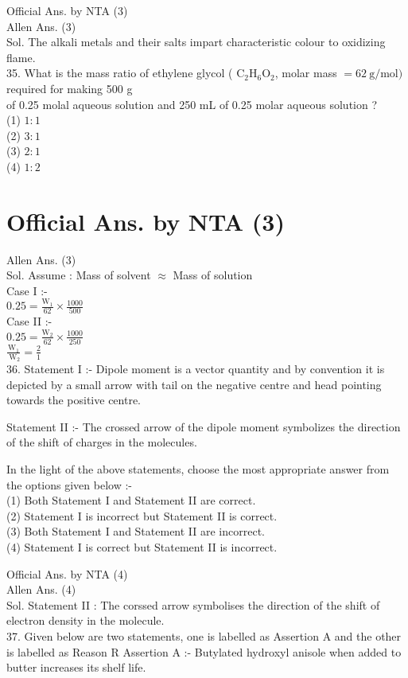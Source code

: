 \documentclass[10pt]{article}
\begin{document}
Official Ans. by NTA (3)\\
Allen Ans. (3)\\
Sol. The alkali metals and their salts impart characteristic colour to oxidizing flame.\\
35. What is the mass ratio of ethylene glycol ( \(\mathrm{C}_{2} \mathrm{H}_{6} \mathrm{O}_{2}\), molar mass \(=62 \mathrm{~g} / \mathrm{mol})\) required for making 500 g\\
of 0.25 molal aqueous solution and 250 mL of 0.25 molar aqueous solution ?\\
(1) \(1: 1\)\\
(2) \(3: 1\)\\
(3) \(2: 1\)\\
(4) \(1: 2\)

\section*{Official Ans. by NTA (3)}
Allen Ans. (3)\\
Sol. Assume : Mass of solvent \(\approx\) Mass of solution\\
Case I :-\\
\(0.25=\frac{\mathrm{W}_{1}}{62} \times \frac{1000}{500}\)\\
Case II :-\\
\(0.25=\frac{\mathrm{W}_{2}}{62} \times \frac{1000}{250}\)\\
\(\frac{\mathrm{W}_{1}}{\mathrm{~W}_{2}}=\frac{2}{1}\)\\
36. Statement I :- Dipole moment is a vector quantity and by convention it is depicted by a small arrow with tail on the negative centre and head pointing towards the positive centre.

Statement II :- The crossed arrow of the dipole moment symbolizes the direction of the shift of charges in the molecules.

In the light of the above statements, choose the most appropriate answer from the options given below :-\\
(1) Both Statement I and Statement II are correct.\\
(2) Statement I is incorrect but Statement II is correct.\\
(3) Both Statement I and Statement II are incorrect.\\
(4) Statement I is correct but Statement II is incorrect.

Official Ans. by NTA (4)\\
Allen Ans. (4)\\
Sol. Statement II : The corssed arrow symbolises the direction of the shift of electron density in the molecule.\\
37. Given below are two statements, one is labelled as Assertion A and the other is labelled as Reason R Assertion A :- Butylated hydroxyl anisole when added to butter increases its shelf life.
\end{document}
